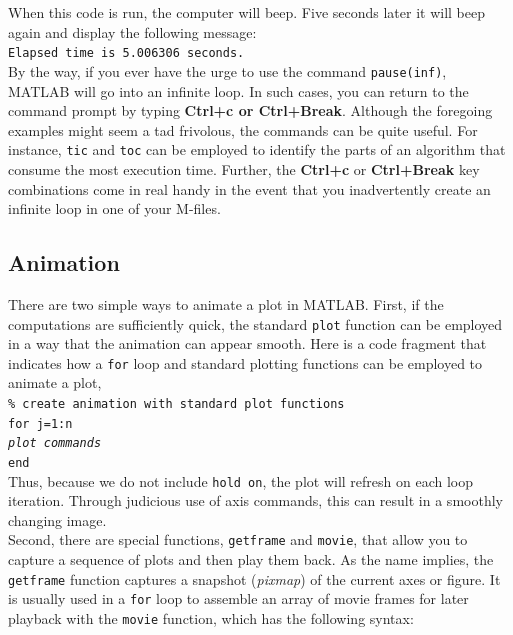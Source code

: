 \documentclass[../main.tex]{subfiles}
\begin{document}
\noindent When this code is run, the computer will beep. Five seconds later it will beep again and display
the following message:\\

\texttt{Elapsed time is 5.006306 seconds.}\\

\noindent By the way, if you ever have the urge to use the command \texttt{pause(inf)}, MATLAB will go
into an infinite loop. In such cases, you can return to the command prompt by typing
\textbf{Ctrl+c or Ctrl+Break}.
Although the foregoing examples might seem a tad frivolous, the commands can be
quite useful. For instance, \texttt{tic} and \texttt{toc} can be employed to identify the parts of an algorithm
that consume the most execution time. Further, the \textbf{Ctrl+c} or \textbf{Ctrl+Break} key combinations
come in real handy in the event that you inadvertently create an infinite loop in
one of your M-files.\\

\subsection{Animation}

\noindent There are two simple ways to animate a plot in MATLAB. First, if the computations are
sufficiently quick, the standard \texttt{plot} function can be employed in a way that the animation
can appear smooth. Here is a code fragment that indicates how a \texttt{for} loop and standard
plotting functions can be employed to animate a plot,\\

\texttt{\% create animation with standard plot functions\\
\indent for j=1:n\\
\indent \emph{plot commands}\\
\indent end}\\

\noindent Thus, because we do not include \texttt{hold on}, the plot will refresh on each loop iteration.
Through judicious use of axis commands, this can result in a smoothly changing image.\\
\indent Second, there are special functions, \texttt{getframe} and \texttt{movie}, that allow you to capture a
sequence of plots and then play them back. As the name implies, the \texttt{getframe} function
captures a snapshot (\emph{pixmap}) of the current axes or figure. It is usually used in a \texttt{for} loop
to assemble an array of movie frames for later playback with the \texttt{movie} function, which
has the following syntax:\\
\end{document}

